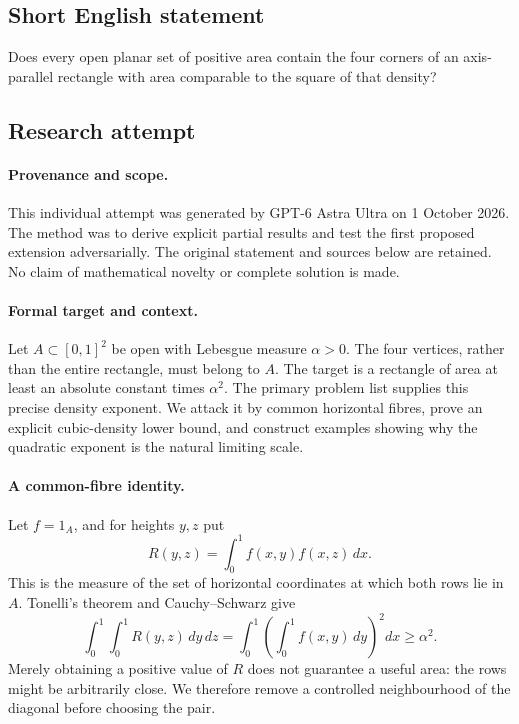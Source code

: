 \documentclass[11pt,a4paper]{article}
\begin{document}
\subsection{Short English statement}

Does every open planar set of positive area contain the four corners of an axis-parallel rectangle with area comparable to the square of that density?

\subsection{Research attempt}

\paragraph{Provenance and scope.}
This individual attempt was generated by GPT-6 Astra Ultra on 1 October 2026. The method was to derive explicit partial results and test the first proposed extension adversarially. The original statement and sources below are retained. No claim of mathematical novelty or complete solution is made.

\paragraph{Formal target and context.}
Let $A\subset[0,1]^2$ be open with Lebesgue measure $\alpha>0$. The four vertices, rather than the entire rectangle, must belong to $A$. The target is a rectangle of area at least an absolute constant times $\alpha^2$. The primary problem list supplies this precise density exponent. We attack it by common horizontal fibres, prove an explicit cubic-density lower bound, and construct examples showing why the quadratic exponent is the natural limiting scale.

\paragraph{A common-fibre identity.}
Let $f=1_A$, and for heights $y,z$ put
\[
 R(y,z)=\int_0^1f(x,y)f(x,z)\,dx.
\]
This is the measure of the set of horizontal coordinates at which both rows lie in $A$. Tonelli's theorem and Cauchy--Schwarz give
\[
 \int_0^1\int_0^1 R(y,z)\,dy\,dz
 =\int_0^1\left(\int_0^1 f(x,y)\,dy\right)^2dx\geq\alpha^2.
\]
Merely obtaining a positive value of $R$ does not guarantee a useful area: the rows might be arbitrarily close. We therefore remove a controlled neighbourhood of the diagonal before choosing the pair.
\end{document}
